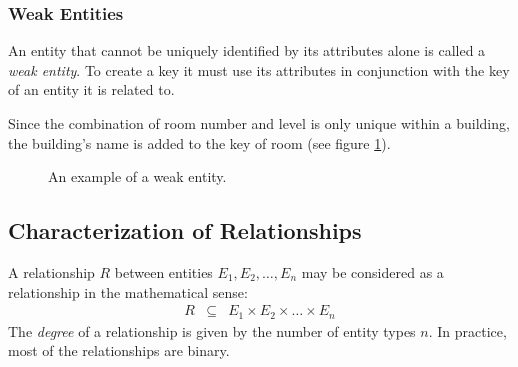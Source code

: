 \subsubsection{Weak Entities}

An entity that cannot be uniquely identified by its attributes alone is called a \emph{weak entity}. To create a key it must use its attributes in conjunction with the key of an entity it is related to.

\begin{example}
Since the combination of room number and level is only unique within a building, the building's name is added to the key of room (see figure \ref{fig_weak_entity}).
\end{example}

\begin{figure}[htbp]
\begin{center}
\end{center}
\caption[Weak Entity]{An example of a weak entity.}
\label{fig_weak_entity}
\end{figure}




\subsection{Characterization of Relationships}

A relationship $R$ between entities $E_1, E_2, \ldots, E_n$ may be considered as a relationship in the mathematical sense:
\[ \begin{array}{rcl}
R & \subseteq & E_1 \times E_2 \times \ldots \times E_n
\end{array} \]
The \emph{degree} of a relationship is given by the number of entity types $n$. In practice, most of the relationships are binary.

